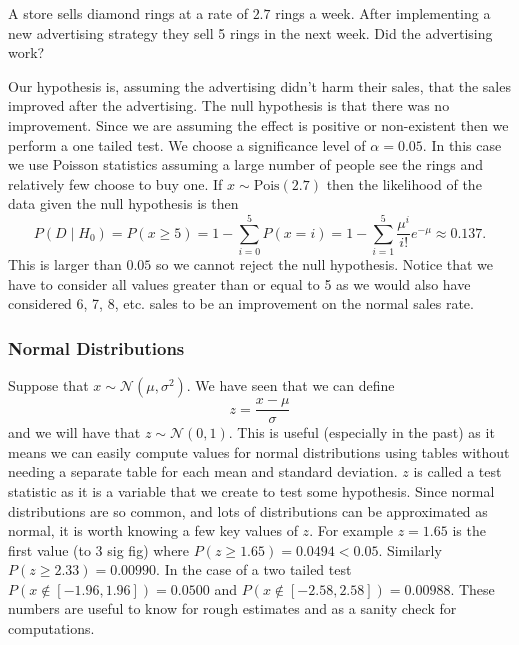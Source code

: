 \documentclass[a4paper]{article}
\newcommand{\st}{\mid}
\newcommand{\distributed}{\sim}
\newcommand{\normal}{\mathcal{N}}
\newcommand{\poisson}{\mathrm{Pois}}
\begin{document}
    \begin{example}
        A store sells diamond rings at a rate of \(2.7\) rings a week.
        After implementing a new advertising strategy they sell 5 rings in the next week.
        Did the advertising work?
        
        Our hypothesis is, assuming the advertising didn't harm their sales, that the sales improved after the advertising.
        The null hypothesis is that there was no improvement.
        Since we are assuming the effect is positive or non-existent then we perform a one tailed test.
        We choose a significance level of \(\alpha = 0.05\).
        In this case we use Poisson statistics assuming a large number of people see the rings and relatively few choose to buy one.
        If \(x\distributed\poisson(2.7)\) then the likelihood of the data given the null hypothesis is then
        \[P(D\st H_0) = P(x \ge 5) = 1 - \sum_{i=0}^{5}P(x = i) = 1 - \sum_{i=1}^{5} \frac{\mu^i}{i!}e^{-\mu} \approx 0.137.\]
        This is larger than \(0.05\) so we cannot reject the null hypothesis.
        Notice that we have to consider all values greater than or equal to 5 as we would also have considered 6, 7, 8, etc. sales to be an improvement on the normal sales rate.
    \end{example}

    \subsubsection{Normal Distributions}
    Suppose that \(x\distributed \normal(\mu, \sigma^2)\).
    We have seen that we can define
    \[z = \frac{x - \mu}{\sigma}\]
    and we will have that \(z\distributed\normal(0, 1)\).
    This is useful (especially in the past) as it means we can easily compute values for normal distributions using tables without needing a separate table for each mean and standard deviation.
    \(z\) is called a test statistic as it is a variable that we create to test some hypothesis.
    Since normal distributions are so common, and lots of distributions can be approximated as normal, it is worth knowing a few key values of \(z\).
    For example \(z = 1.65\) is the first value (to 3 sig fig) where \(P(z \ge 1.65) = 0.0494 < 0.05\).
    Similarly \(P(z \ge 2.33) = 0.00990\).
    In the case of a two tailed test \(P(x \notin [-1.96, 1.96]) = 0.0500\) and \(P(x \notin [-2.58, 2.58]) = 0.00988\).
    These numbers are useful to know for rough estimates and as a sanity check for computations.
    
\end{document}
